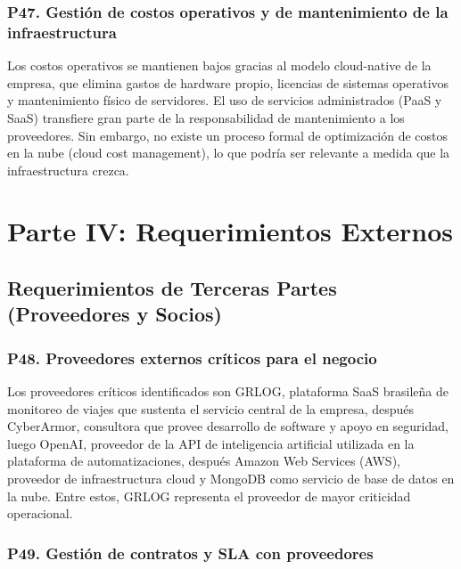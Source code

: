 \documentclass[12pt]{article}
\begin{document}
\subsubsection*{\textbf{P47. Gesti\'on de costos operativos y de mantenimiento de la infraestructura}}

Los costos operativos se mantienen bajos gracias al modelo cloud-native de la empresa,
que elimina gastos de hardware propio, licencias de sistemas operativos y mantenimiento
f\'isico de servidores. El uso de servicios administrados (PaaS y SaaS) transfiere gran
parte de la responsabilidad de mantenimiento a los proveedores. Sin embargo, no existe
un proceso formal de optimizaci\'on de costos en la nube (cloud cost management), lo
que podr\'ia ser relevante a medida que la infraestructura crezca.


\section{Parte IV: Requerimientos Externos}

\subsection{Requerimientos de Terceras Partes (Proveedores y Socios)}

\subsubsection*{\textbf{P48. Proveedores externos cr\'iticos para el negocio}}

Los proveedores cr\'iticos identificados son GRLOG, plataforma SaaS brasile\~na
de monitoreo de viajes que sustenta el servicio central de la empresa, después CyberArmor,
consultora que provee desarrollo de software y apoyo en seguridad, luego OpenAI,
proveedor de la API de inteligencia artificial utilizada en la plataforma de automatizaciones, después Amazon Web Services (AWS), proveedor de infraestructura cloud y MongoDB
como servicio de base de datos en la nube. Entre estos, GRLOG representa el proveedor de
mayor criticidad operacional.

\subsubsection*{\textbf{P49. Gesti\'on de contratos y SLA con proveedores}}
\end{document}
